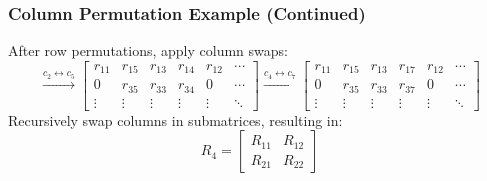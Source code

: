 \documentclass{beamer}
\begin{document}
\begin{frame}
    \frametitle{Column Permutation Example (Continued)}
    After row permutations, apply column swaps:
    \[
    \xrightarrow{c_2 \leftrightarrow c_5}
    \begin{bmatrix}
    r_{11} & r_{15} & r_{13} & r_{14} & r_{12} & \cdots \\
    0 & r_{35} & r_{33} & r_{34} & 0 & \cdots \\
    \vdots & \vdots & \vdots & \vdots & \vdots & \ddots
    \end{bmatrix}
    \xrightarrow{c_4 \leftrightarrow c_7}
    \begin{bmatrix}
    r_{11} & r_{15} & r_{13} & r_{17} & r_{12} & \cdots \\
    0 & r_{35} & r_{33} & r_{37} & 0 & \cdots \\
    \vdots & \vdots & \vdots & \vdots & \vdots & \ddots
    \end{bmatrix}
    \]
    Recursively swap columns in submatrices, resulting in:
    \[
    R_4 = \begin{bmatrix} R_{11} & R_{12} \\ R_{21} & R_{22} \end{bmatrix}
    \]
\end{frame}
\end{document}
